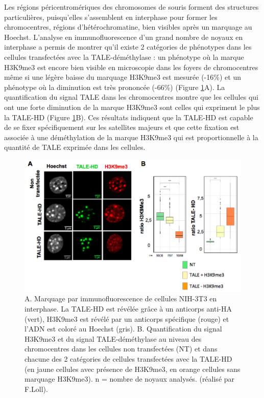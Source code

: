 \documentclass[a4paper,12pt,times]{report}
\newcommand{\scaption}[1]{\caption{\footnotesize{#1}}}
\begin{document}
\bigskip
Les régions péricentromériques des chromosomes de souris forment des structures particulières, puisqu’elles s’assemblent en interphase pour former les chromocentres, régions d’hétérochromatine, bien visibles après un marquage au Hoechst. L'analyse en immunofluorescence d'un grand nombre de noyaux en interphase a permis de montrer qu'il existe 2 catégories de phénotypes dans les cellules transfectées avec la TALE-déméthylase : un phénotype où la marque H3K9me3 est encore bien visible en microscopie dans les foyers de chromocentres même si une légère baisse du marquage H3K9me3 est mesurée (-16\%) et un phénotype où la diminution est très prononcée (-66\%) (Figure \ref{Résultats}A). La quantification du signal TALE dans les chromocentres montre que les cellules qui ont une forte diminution de la marque H3K9me3 sont celles qui expriment le plus la TALE-HD (Figure \ref{Résultats}B). Ces résultats indiquent que la TALE-HD est capable de se fixer spécifiquement sur les satellites majeurs  et que cette fixation est associée à une déméthylation de la marque H3K9me3 qui est proportionnelle à la quantité de TALE exprimée dans les cellules.


\bigskip

\begin{figure}[!ht]
\centering 
\includegraphics[scale=0.45]{result0.png}
\scaption{ A. Marquage par immunofluorescence de cellules NIH-3T3 en interphase. La TALE-HD est révélée grâce à un anticorps anti-HA (vert), H3K9me3 est révélé par un anticorps spécifique (rouge) et l’ADN est coloré au Hoechst (gris). B. Quantification du signal H3K9me3 et du signal TALE-déméthylase au niveau des chromocentres dans les cellules non transfectées (NT) et dans chacune des 2 catégories de cellules transfectées avec la TALE-HD (en jaune cellules avec présence de H3K9me3, en orange cellules sans marquage H3K9me3). n = nombre de noyaux analysés.
 (réalisé par F.Loll).}
\label{Résultats}
\end{figure}
\end{document}
